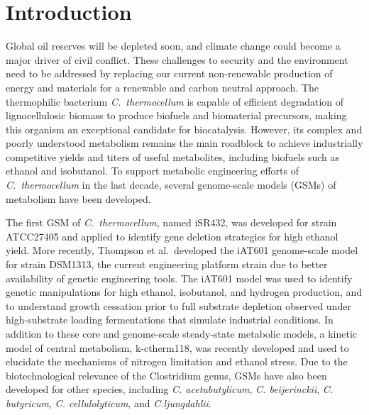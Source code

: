 \section{Introduction}
Global oil reserves will be depleted soon,\citep{shafiee2009}
and climate change could become a major driver of civil conflict.\citep{hsiang2011}
These challenges to security and the environment need to be addressed by replacing our current non-renewable production of energy and materials for a renewable and carbon neutral approach.\citep{ragauskas2006}
The thermophilic bacterium \textit{C.~thermocellum} is capable of efficient degradation of lignocellulosic biomass to produce biofuels and biomaterial precursors, making this organism an exceptional candidate for biocatalysis.\citep{olson2012}
However, its complex and poorly understood metabolism remains the main roadblock to achieve industrially competitive yields and titers of useful metabolites, including biofuels such as ethanol\citep{tian2016} and isobutanol.\citep{lin2015}
To support metabolic engineering efforts of \textit{C.~thermocellum} in the last decade, several genome-scale models (GSMs) of metabolism have been developed.

The first GSM of \textit{C.~thermocellum}, named iSR432, was developed for strain ATCC27405  and applied to identify gene deletion strategies for high ethanol yield. \citep{roberts2010}
More recently, Thompson et al.\ developed the iAT601 genome-scale model \citep{thompson2016} for strain DSM1313, the current engineering platform strain due to better availability of genetic engineering tools.\citep{argyros2011}
The iAT601 model was used to identify genetic manipulations for high ethanol, isobutanol, and hydrogen production,\citep{thompson2016} and to understand growth cessation prior to full substrate depletion observed under high-substrate loading fermentations that simulate industrial conditions.\citep{thompson2017}
In addition to these core and genome-scale steady-state metabolic models, a kinetic model of central metabolism, k-ctherm118, was recently developed and used to elucidate the mechanisms of nitrogen limitation and ethanol stress.\citep{dash2017} Due to the biotechnological relevance of the Clostridium genus, GSMs have also been developed for other species,\citep{dash2016} including
\textit{C. acetubutylicum},\citep{lee2018, senger2008, salimi2010, mcanulty2012, wallenius2013, dash2014, yoo2015}
\textit{C. beijerinckii},\citep{milne2011}
\textit{C. butyricum},\citep{serrano2017}
\textit{C. cellulolyticum},\citep{salimi2010}
and \textit{C.ljungdahlii}.\citep{nagarajan2013}


